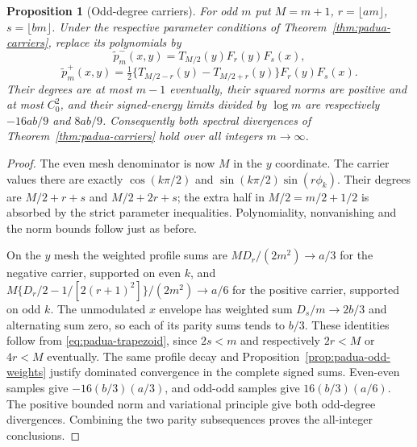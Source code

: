 \documentclass[preprint,12pt,a4paper]{elsarticle}
\newtheorem{proposition}[theorem]{Proposition}
\theoremstyle{remark}
\begin{document}
\begin{proposition}[Odd-degree carriers]\label{prop:padua-odd-carriers}
For odd $m$ put $M=m+1$, $r=\lfloor am\rfloor$, $s=\lfloor bm\rfloor$.
Under the respective parameter conditions of
Theorem~\ref{thm:padua-carriers}, replace its polynomials by
\[
 \widetilde p_m^-(x,y)=T_{M/2}(y)F_r(y)F_s(x),
\]
\[
 \widetilde p_m^+(x,y)=\tfrac12
    \{T_{M/2-r}(y)-T_{M/2+r}(y)\}F_r(y)F_s(x).
\]
Their degrees are at most $m-1$ eventually, their squared norms are
positive and at most $C_0^2$, and their signed-energy limits divided
by $\log m$ are respectively $-16ab/9$ and $8ab/9$.
Consequently both spectral divergences of
Theorem~\ref{thm:padua-carriers} hold over all integers $m\to\infty$.
\end{proposition}
\begin{proof}
The even mesh denominator is now $M$ in the $y$ coordinate. The
carrier values there are exactly $\cos(k\pi/2)$ and
$\sin(k\pi/2)\sin(r\phi_k)$. Their degrees are
$M/2+r+s$ and $M/2+2r+s$; the extra half in $M/2=m/2+1/2$ is
absorbed by the strict parameter inequalities. Polynomiality,
nonvanishing and the norm bounds follow just as before.

On the $y$ mesh the weighted profile sums are
$MD_r/(2m^2)\to a/3$ for the negative carrier, supported on even $k$,
and $M\{D_r/2-1/[2(r+1)^2]\}/(2m^2)\to a/6$ for the positive
carrier, supported on odd $k$. The unmodulated $x$ envelope has
weighted sum $D_s/m\to2b/3$ and alternating sum zero, so each of
its parity sums tends to $b/3$. These identities follow from
\eqref{eq:padua-trapezoid}, since $2s<m$ and respectively $2r<M$
or $4r<M$ eventually. The same profile decay and
Proposition~\ref{prop:padua-odd-weights} justify dominated convergence
in the complete signed sums. Even-even samples give
$-16(b/3)(a/3)$, and odd-odd samples give $16(b/3)(a/6)$.
The positive bounded norm and variational principle give both
odd-degree divergences. Combining the two parity subsequences proves
the all-integer conclusions.
\end{proof}
\end{document}
